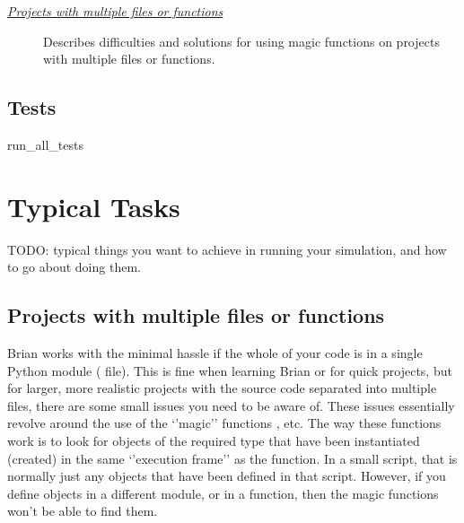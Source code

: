 \documentclass[letterpaper,10pt,english]{manual}
\begin{document}

\begin{description}
\item[\hyperlink{projects-with-multiple-files}{\emph{Projects with multiple files or functions}}] \leavevmode
Describes difficulties and solutions for using magic functions
on projects with multiple files or functions.

\end{description}



\resetcurrentobjects
\hypertarget{--doc-reference-tests}{}

\hypertarget{index-113}{}\section{Tests}

\hypertarget{brian.run_all_tests}{}\begin{funcdesc}{run\_all\_tests}{}\end{funcdesc}

\resetcurrentobjects
\hypertarget{--doc-typicaltasks}{}

\chapter{Typical Tasks}

TODO: typical things you want to achieve in running your simulation,
and how to go about doing them.

\resetcurrentobjects
\hypertarget{--doc-tasks_multiplefiles}{}

\hypertarget{projects-with-multiple-files}{}\section{Projects with multiple files or functions}

Brian works with the minimal hassle if the whole of your code is in a
single Python module ( file). This is fine when learning Brian
or for quick projects, but for larger, more realistic projects with
the source code separated into multiple files, there are some small
issues you need to be aware of. These issues essentially revolve
around the use of the `'magic'' functions \hyperlink{brian.run}{}, etc. The way
these functions work is to look for objects of the required type that
have been instantiated (created) in the same `'execution frame'' as
the \hyperlink{brian.run}{} function. In a small script, that is normally just
any objects that have been defined in that script. However, if you
define objects in a different module, or in a function, then the
magic functions won't be able to find them.
\end{document}
